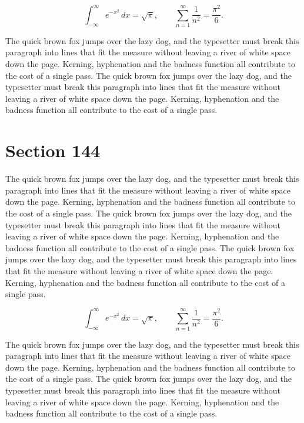 \documentclass{article}
\begin{document}
\begin{equation}
\int_{-\infty}^{\infty} e^{-x^{2}}\,dx = \sqrt{\pi}, \qquad
\sum_{n=1}^{\infty} \frac{1}{n^{2}} = \frac{\pi^{2}}{6}.
\end{equation}

The quick brown fox jumps over the lazy dog, and the typesetter must break this paragraph into lines that fit the measure without leaving a river of white space down the page. Kerning, hyphenation and the badness function all contribute to the cost of a single pass. The quick brown fox jumps over the lazy dog, and the typesetter must break this paragraph into lines that fit the measure without leaving a river of white space down the page. Kerning, hyphenation and the badness function all contribute to the cost of a single pass. 
\section{Section 144}
The quick brown fox jumps over the lazy dog, and the typesetter must break this paragraph into lines that fit the measure without leaving a river of white space down the page. Kerning, hyphenation and the badness function all contribute to the cost of a single pass. The quick brown fox jumps over the lazy dog, and the typesetter must break this paragraph into lines that fit the measure without leaving a river of white space down the page. Kerning, hyphenation and the badness function all contribute to the cost of a single pass. The quick brown fox jumps over the lazy dog, and the typesetter must break this paragraph into lines that fit the measure without leaving a river of white space down the page. Kerning, hyphenation and the badness function all contribute to the cost of a single pass. 

\begin{equation}
\int_{-\infty}^{\infty} e^{-x^{2}}\,dx = \sqrt{\pi}, \qquad
\sum_{n=1}^{\infty} \frac{1}{n^{2}} = \frac{\pi^{2}}{6}.
\end{equation}

The quick brown fox jumps over the lazy dog, and the typesetter must break this paragraph into lines that fit the measure without leaving a river of white space down the page. Kerning, hyphenation and the badness function all contribute to the cost of a single pass. The quick brown fox jumps over the lazy dog, and the typesetter must break this paragraph into lines that fit the measure without leaving a river of white space down the page. Kerning, hyphenation and the badness function all contribute to the cost of a single pass. 
\end{document}
